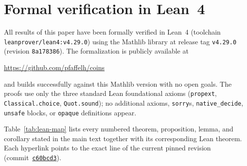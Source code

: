 \documentclass[12pt]{article}
\theoremstyle{definition}
\theoremstyle{remark}
\begin{document}
\appendix

\section{Formal verification in Lean~4}\label{app:lean}

All results of this paper have been formally verified in
Lean~4 (toolchain \texttt{leanprover/lean4:v4.29.0}) using the
Mathlib library at release tag \texttt{v4.29.0} (revision
\texttt{8a178386}).  The formalization is publicly available at
\begin{center}
  \url{https://github.com/pfaffelh/coins}
\end{center}
and builds successfully against this Mathlib version with no open
goals.  The proofs use only the three standard Lean foundational
axioms (\texttt{propext}, \texttt{Classical.choice},
\texttt{Quot.sound}); no additional axioms, \texttt{sorry}s,
\texttt{native\_decide}, \texttt{unsafe} blocks, or
\texttt{opaque} definitions appear.

Table~\ref{tab:lean-map} lists every numbered theorem,
proposition, lemma, and corollary stated in the main text together
with its corresponding Lean theorem.  Each hyperlink points to the
exact line of the current pinned revision
(commit~\href{https://github.com/pfaffelh/coins/tree/c60bcd3}{\texttt{c60bcd3}}).
\end{document}

